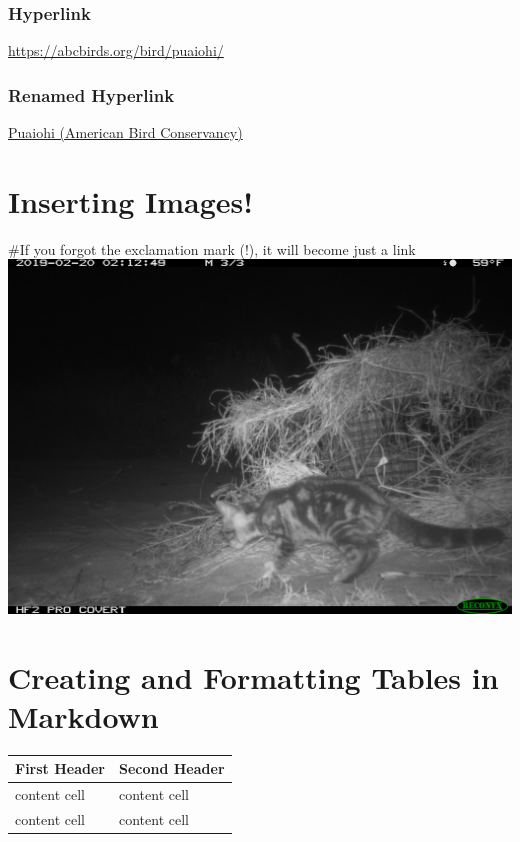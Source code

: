 \documentclass[
]{article}
\begin{document}
\subsubsection{Hyperlink}\label{hyperlink}

\url{https://abcbirds.org/bird/puaiohi/}

\subsubsection{Renamed Hyperlink}\label{renamed-hyperlink}

\href{https://abcbirds.org/bird/puaiohi/}{Puaiohi (American Bird
Conservancy)}

\section{Inserting Images!}\label{inserting-images}

\#If you forgot the exclamation mark (!), it will become just a link
\includegraphics{RCNX0624.JPG}

\section{Creating and Formatting Tables in
Markdown}\label{creating-and-formatting-tables-in-markdown}

\begin{longtable}[]{@{}ll@{}}
\toprule\noalign{}
First Header & Second Header \\
\midrule\noalign{}
\endhead
\bottomrule\noalign{}
\endlastfoot
content cell & content cell \\
content cell & content cell \\
\end{longtable}
\end{document}
